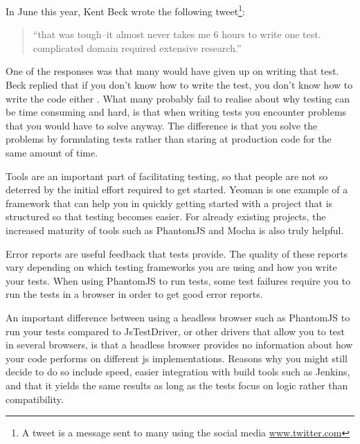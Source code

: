 \documentclass[11pt]{article}
\begin{document}
In June this year, Kent Beck wrote the following tweet\footnote{A tweet is a message sent to many using the social media \url{www.twitter.com}}:

\begin{quote}
``that was tough--it almost never takes me 6 hours to write one test. complicated domain required extensive research.''
\end{quote}

One of the responses was that many would have given up on writing that test. Beck replied that if you don't know how to write the test, you don't know how to write the code either \cite{TwitterKentBeck}. What many probably fail to realise about why testing can be time consuming and hard, is that when writing tests you encounter problems that you would have to solve anyway. The difference is that you solve the problems by formulating tests rather than staring at production code for the same amount of time. \cite[question~11]{Edelstam}

Tools are an important part of facilitating testing, so that people are not so deterred by the initial effort required to get started. Yeoman is one example of a framework that can help you in quickly getting started with a project that is structured so that testing becomes easier. For already existing projects, the increased maturity of tools such as PhantomJS and Mocha is also truly helpful. \cite[questions~11-12 and 20]{Edelstam}

Error reports are useful feedback that tests provide. The quality of these reports vary depending on which testing frameworks you are using and how you write your tests. When using PhantomJS to run tests, some test failures require you to run the tests in a browser in order to get good error reports. \cite[question~12]{Edelstam}

An important difference between using a headless browser such as PhantomJS to run your tests compared to JsTestDriver, or other drivers that allow you to test in several browsers, is that a headless browser provides no information about how your code performs on different \gls{js} implementations. Reasons why you might still decide to do so include speed, easier integration with build tools such as Jenkins, and that it yields the same results as long as the tests focus on logic rather than compatibility. \cite[questions~13-15]{Edelstam}

\end{document}

